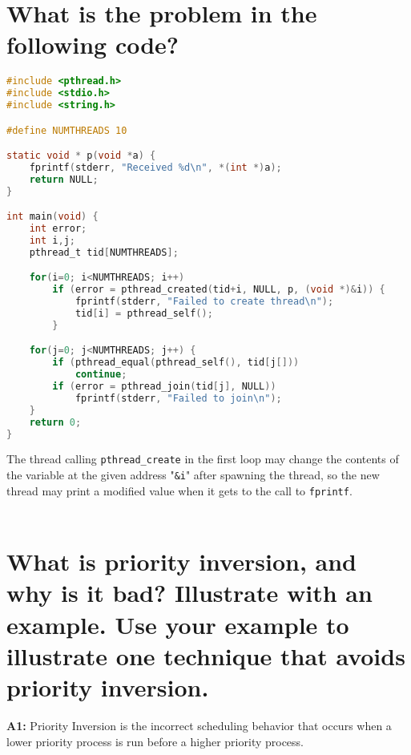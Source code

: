 \documentclass{article}
\begin{document}
\section{What is the problem in the following code?}
\begin{lstlisting}[language=C, basicstyle=\ttfamily\footnotesize, showstringspaces=false, stringstyle=\color{Salmon}, commentstyle=\itshape\color{magenta},  keywordstyle=\color{Bittersweet}]
#include <pthread.h>
#include <stdio.h>
#include <string.h>

#define NUMTHREADS 10

static void * p(void *a) {
	fprintf(stderr, "Received %d\n", *(int *)a);
	return NULL;
}

int main(void) {
	int error;
	int i,j;
	pthread_t tid[NUMTHREADS];

	for(i=0; i<NUMTHREADS; i++)
		if (error = pthread_created(tid+i, NULL, p, (void *)&i)) {
			fprintf(stderr, "Failed to create thread\n");
			tid[i] = pthread_self();
		}

	for(j=0; j<NUMTHREADS; j++) {
		if (pthread_equal(pthread_self(), tid[j[]))
			continue;
		if (error = pthread_join(tid[j], NULL))
			fprintf(stderr, "Failed to join\n");
	}
	return 0;
}
\end{lstlisting}
The thread calling \texttt{pthread\_create} in the first loop may change the contents of the variable at the given address "\texttt{\&i}" after spawning the thread, so the new thread may print a modified value when it gets to the call to \texttt{fprintf}. \\
\\
\section{What is priority inversion, and why is it bad? Illustrate with an example. Use your example to illustrate one technique that avoids priority inversion.}
\textbf{A1:} Priority Inversion is the incorrect scheduling behavior that occurs when a lower priority process is run before a higher priority process.
\end{document}
